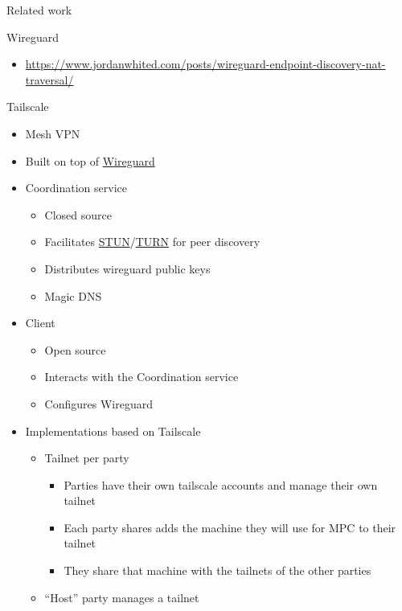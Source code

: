 \begin{frame}[fragile]{Related work}
\begin{block}{Wireguard}
\begin{itemize}
  \begin{itemize}
  \tightlist
  \item
    \url{https://www.jordanwhited.com/posts/wireguard-endpoint-discovery-nat-traversal/}
  \end{itemize}
\end{itemize}
\end{block}

\begin{block}{Tailscale}
\protect\hypertarget{tailscale}{}
\begin{itemize}
\tightlist
\item
  Mesh VPN
\item
  Built on top of \href{notes/02051-wireguard.md}{Wireguard}
\item
  Coordination service

  \begin{itemize}
  \tightlist
  \item
    Closed source
  \item
    Facilitates
    \href{notes/0202-nat\#Session\%20Traversal\%20Utilities\%20for\%20NAT\%20(STUN)}{STUN}/\href{notes/02021-internet-protocol.md\#test}{TURN}
    for peer discovery
  \item
    Distributes wireguard public keys
  \item
    Magic DNS
  \end{itemize}
\item
  Client

  \begin{itemize}
  \tightlist
  \item
    Open source
  \item
    Interacts with the Coordination service
  \item
    Configures Wireguard
  \end{itemize}
\item
  Implementations based on Tailscale

  \begin{itemize}
  \tightlist
  \item
    Tailnet per party

    \begin{itemize}
    \tightlist
    \item
      Parties have their own tailscale accounts and manage their own
      tailnet
    \item
      Each party shares adds the machine they will use for MPC to their
      tailnet
    \item
      They share that machine with the tailnets of the other parties
    \end{itemize}
  \item
    ``Host'' party manages a tailnet


\end{itemize}
\end{itemize}
\end{block}
\end{frame}
